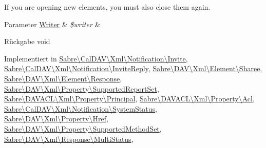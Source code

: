 If you are opening new elements, you must also close them again.


\begin{DoxyParams}[1]{Parameter}
\mbox{\hyperlink{class_sabre_1_1_xml_1_1_writer}{Writer}} & {\em \$writer} & \\
\hline
\end{DoxyParams}
\begin{DoxyReturn}{Rückgabe}
void 
\end{DoxyReturn}


Implementiert in \mbox{\hyperlink{class_sabre_1_1_cal_d_a_v_1_1_xml_1_1_notification_1_1_invite_a47eb1187c379ceed37748741294e3760}{Sabre\textbackslash{}\+Cal\+D\+A\+V\textbackslash{}\+Xml\textbackslash{}\+Notification\textbackslash{}\+Invite}}, \mbox{\hyperlink{class_sabre_1_1_cal_d_a_v_1_1_xml_1_1_notification_1_1_invite_reply_a652400645af9418719cf085364eb4ace}{Sabre\textbackslash{}\+Cal\+D\+A\+V\textbackslash{}\+Xml\textbackslash{}\+Notification\textbackslash{}\+Invite\+Reply}}, \mbox{\hyperlink{class_sabre_1_1_d_a_v_1_1_xml_1_1_element_1_1_sharee_a6f2e1948f0aa0f060714080ce5ab40a2}{Sabre\textbackslash{}\+D\+A\+V\textbackslash{}\+Xml\textbackslash{}\+Element\textbackslash{}\+Sharee}}, \mbox{\hyperlink{class_sabre_1_1_d_a_v_1_1_xml_1_1_element_1_1_response_ab0849b6aace12b8039ca08461af88f69}{Sabre\textbackslash{}\+D\+A\+V\textbackslash{}\+Xml\textbackslash{}\+Element\textbackslash{}\+Response}}, \mbox{\hyperlink{class_sabre_1_1_d_a_v_1_1_xml_1_1_property_1_1_supported_report_set_ae9986a7b7f6f9f08983bc740f6e1b357}{Sabre\textbackslash{}\+D\+A\+V\textbackslash{}\+Xml\textbackslash{}\+Property\textbackslash{}\+Supported\+Report\+Set}}, \mbox{\hyperlink{class_sabre_1_1_d_a_v_a_c_l_1_1_xml_1_1_property_1_1_principal_aeaa0152eca3d1706c56e30964c8f4ff3}{Sabre\textbackslash{}\+D\+A\+V\+A\+C\+L\textbackslash{}\+Xml\textbackslash{}\+Property\textbackslash{}\+Principal}}, \mbox{\hyperlink{class_sabre_1_1_d_a_v_a_c_l_1_1_xml_1_1_property_1_1_acl_a2670dfe65ae9d0745f9785c297a5b320}{Sabre\textbackslash{}\+D\+A\+V\+A\+C\+L\textbackslash{}\+Xml\textbackslash{}\+Property\textbackslash{}\+Acl}}, \mbox{\hyperlink{class_sabre_1_1_cal_d_a_v_1_1_xml_1_1_notification_1_1_system_status_a6f8d1c96033b9a803133844468042b96}{Sabre\textbackslash{}\+Cal\+D\+A\+V\textbackslash{}\+Xml\textbackslash{}\+Notification\textbackslash{}\+System\+Status}}, \mbox{\hyperlink{class_sabre_1_1_d_a_v_1_1_xml_1_1_property_1_1_href_ad1a4047eb7d32ddbf52aba7f5125f9fa}{Sabre\textbackslash{}\+D\+A\+V\textbackslash{}\+Xml\textbackslash{}\+Property\textbackslash{}\+Href}}, \mbox{\hyperlink{class_sabre_1_1_d_a_v_1_1_xml_1_1_property_1_1_supported_method_set_afcdb94acaf6d8fead3559dd9d181dd83}{Sabre\textbackslash{}\+D\+A\+V\textbackslash{}\+Xml\textbackslash{}\+Property\textbackslash{}\+Supported\+Method\+Set}}, \mbox{\hyperlink{class_sabre_1_1_d_a_v_1_1_xml_1_1_response_1_1_multi_status_a91767722f4c127274426027cc6006d18}{Sabre\textbackslash{}\+D\+A\+V\textbackslash{}\+Xml\textbackslash{}\+Response\textbackslash{}\+Multi\+Status}}, 
